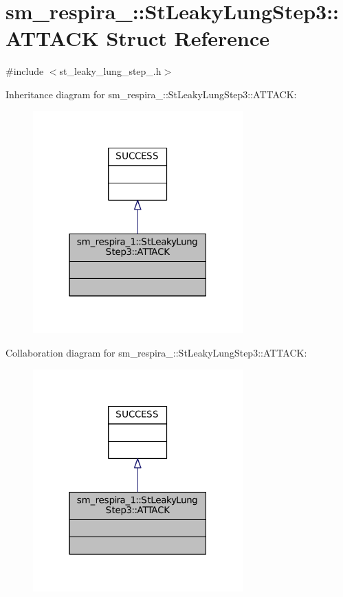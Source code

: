 \hypertarget{structsm__respira__1_1_1StLeakyLungStep3_1_1ATTACK}{}\section{sm\+\_\+respira\+\_\+:\+:St\+Leaky\+Lung\+Step3\+:\+:A\+T\+T\+A\+CK Struct Reference}
\label{structsm__respira__1_1_1StLeakyLungStep3_1_1ATTACK}


{\ttfamily \#include $<$st\+\_\+leaky\+\_\+lung\+\_\+step\+\_.\+h$>$}



Inheritance diagram for sm\+\_\+respira\+\_\+:\+:St\+Leaky\+Lung\+Step3\+:\+:A\+T\+T\+A\+CK\+:
\nopagebreak
\begin{figure}[H]
\begin{center}
\leavevmode
\includegraphics[width=229pt]{structsm__respira__1_1_1StLeakyLungStep3_1_1ATTACK__inherit__graph}
\end{center}
\end{figure}


Collaboration diagram for sm\+\_\+respira\+\_\+:\+:St\+Leaky\+Lung\+Step3\+:\+:A\+T\+T\+A\+CK\+:
\nopagebreak
\begin{figure}[H]
\begin{center}
\leavevmode
\includegraphics[width=229pt]{structsm__respira__1_1_1StLeakyLungStep3_1_1ATTACK__coll__graph}
\end{center}
\end{figure}


